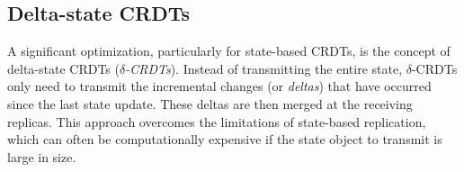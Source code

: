 \subsection{Delta-state CRDTs}
A significant optimization, particularly for state-based CRDTs, is the concept of
delta-state CRDTs (\textit{$\delta$-CRDTs}). Instead of transmitting the entire state,
$\delta$-CRDTs only need to transmit the incremental changes (or \textit{deltas}) that have
occurred since the last state update. These deltas are then merged at the receiving
replicas. This approach overcomes the limitations of state-based replication, which can
often be computationally expensive if the state object to transmit is large in size.